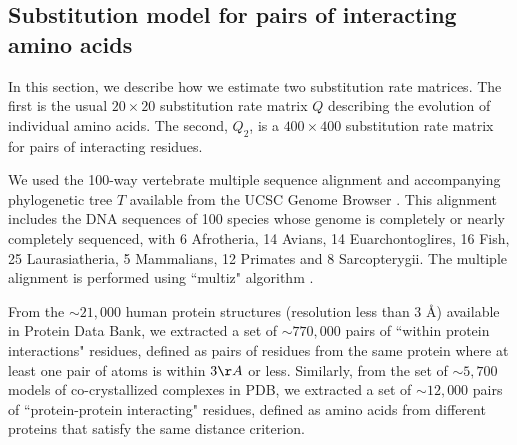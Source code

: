 
\subsection{Substitution model for pairs of interacting amino acids \label{sec:gwasQ2}}

In this section, we describe how we estimate two substitution rate matrices. The first is the usual $20 \times 20$ substitution rate matrix $Q$ describing the evolution of individual amino acids. The second, $Q_2$, is a $400 \times 400$ substitution rate matrix for pairs of interacting residues. 

We used the 100-way vertebrate multiple sequence alignment and accompanying phylogenetic tree $T$ available from the UCSC Genome Browser \cite{karolchik2014ucsc}. This alignment includes the DNA sequences of 100 species whose genome is completely or nearly completely sequenced, with 6 Afrotheria, 14 Avians, 14 Euarchontoglires, 16 Fish, 25 Laurasiatheria, 5 Mammalians, 12 Primates and 8 Sarcopterygii. The multiple alignment is performed using ``multiz" algorithm \cite{blanchette2004aligning,kielbasa2011adaptive}.

From the $\sim 21,000$ human protein structures (resolution less than $3$ \AA) available in Protein Data Bank, we extracted a set of $\sim770,000$ pairs of ``within protein interactions" residues, defined as pairs of residues from the same protein where at least one pair of atoms is within $3 \AA$  or less. Similarly, from the set of $\sim5,700$ models of co-crystallized complexes in PDB, we extracted a set of $\sim12,000$ pairs of ``protein-protein interacting" residues, defined as amino acids from different proteins that satisfy the same distance criterion.

